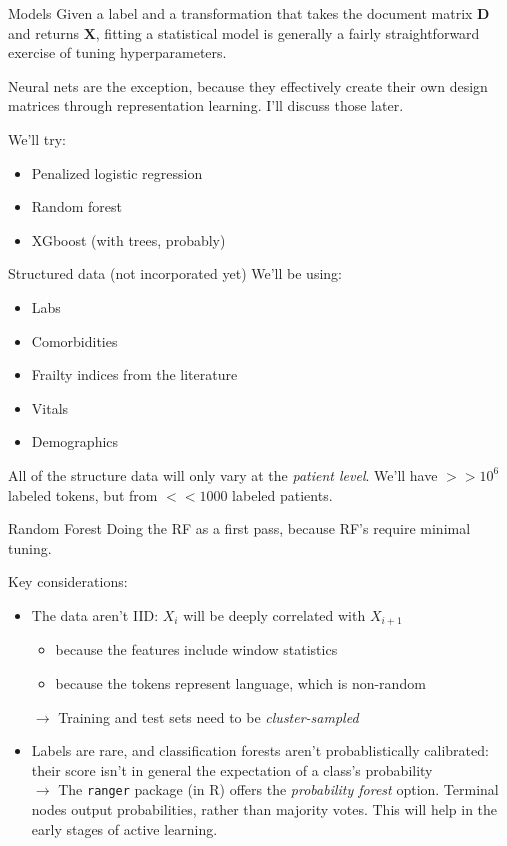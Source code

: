 \documentclass[10pt]{beamer}
\begin{document}
\begin{frame}{Models}
Given a label and a transformation that takes the document matrix $\bm{D}$ and returns $\bm{X}$, fitting a statistical model is generally a fairly straightforward exercise of tuning hyperparameters.  

Neural nets are the exception, because they effectively create their own design matrices through representation learning.  I'll discuss those later.

We'll try:
\begin{itemize}
\item Penalized logistic regression
\item Random forest
\item XGboost (with trees, probably)
\end{itemize}
\end{frame}


\begin{frame}{Structured data (not incorporated yet)}
We'll be using:
\begin{itemize}
\item Labs
\item Comorbidities
\item Frailty indices from the literature
\item Vitals
\item Demographics
\end{itemize}
All of the structure data will only vary at the \textit{patient level}.  We'll have $>>10^6$ labeled tokens, but from $<<1000$ labeled patients. 
\end{frame}

\begin{frame}{Random Forest}
Doing the RF as a first pass, because RF's require minimal tuning.

Key considerations:
\begin{itemize}
\item The data aren't IID:  $X_i$ will be deeply correlated with $X_{i+1}$
	\begin{itemize}
	\item because the features include window statistics
	\item because the tokens represent language, which is non-random
	\end{itemize}
$\rightarrow$ Training and test sets need to be \textit{cluster-sampled}
\item Labels are rare, and classification forests aren't probablistically calibrated:  their score isn't in general the expectation of a class's probability\\
$\rightarrow$ The \texttt{ranger} package (in R) offers the \textit{probability forest} option.  Terminal nodes output probabilities, rather than majority votes.  This will help in the early stages of active learning.
\end{itemize}
\end{frame}
\end{document}
